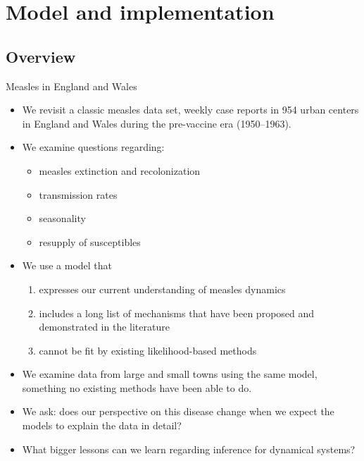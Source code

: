 
\section{Model and implementation}

\subsection{Overview}

\begin{frame}[allowframebreaks]{Measles in England and Wales}
  \begin{itemize}
  \item We revisit a classic measles data set, weekly case reports in 954 urban centers in England and Wales during the pre-vaccine era (1950--1963).
  \item We examine questions regarding:
  \begin{itemize}
    \item measles extinction and recolonization
    \item transmission rates
    \item seasonality
    \item resupply of susceptibles
  \end{itemize}
  \item We use a model that
    \begin{enumerate}
    \item expresses our current understanding of measles dynamics
    \item includes a long list of mechanisms that have been proposed and demonstrated in the literature
    \item cannot be fit by existing likelihood-based methods
    \end{enumerate}
  \item We examine data from large and small towns using the same model, something no existing methods have been able to do.
  \item We ask: does our perspective on this disease change when we expect the models to explain the data in detail?
  \item What bigger lessons can we learn regarding inference for dynamical systems?
  \end{itemize}
\end{frame}

